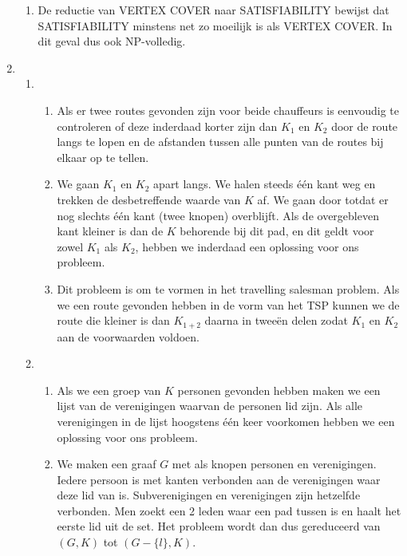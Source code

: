 \documentclass[11pt]{article}
\begin{document}
\begin{enumerate}
\begin{enumerate}
            \item
                De reductie van VERTEX COVER naar SATISFIABILITY bewijst dat
                SATISFIABILITY minstens net zo moeilijk is als VERTEX COVER. In
                dit geval dus ook NP-volledig.

        \end{enumerate}
    \item
        \begin{enumerate}
            \item
                \begin{enumerate}[a]
                    \item Als er twee routes gevonden zijn voor beide chauffeurs is eenvoudig te controleren of deze inderdaad korter zijn dan $K_1$ en $K_2$ door de route langs te lopen en de afstanden tussen alle punten van de routes bij elkaar op te tellen.
                    \item We gaan $K_1$ en $K_2$ apart langs. We halen steeds \'{e}\'{e}n kant weg en trekken de desbetreffende waarde van $K$ af. We gaan door totdat er nog slechts \'{e}\'{e}n kant (twee knopen) overblijft. Als de overgebleven kant kleiner is dan de $K$ behorende bij dit pad, en dit geldt voor zowel $K_1$ als $K_2$, hebben we inderdaad een oplossing voor ons probleem.
                    \item Dit probleem is om te vormen in het travelling salesman problem. Als we een route gevonden hebben in de vorm van het TSP kunnen we de route die kleiner is dan $K_{1+2}$ daarna in twee\"{e}n delen zodat $K_1$ en $K_2$ aan de voorwaarden voldoen.
                \end{enumerate}
            \item
                \begin{enumerate}[a]
                    \item Als we een groep van $K$ personen gevonden hebben
                        maken we een lijst van de verenigingen waarvan de
                        personen lid zijn. Als alle verenigingen in de lijst
                        hoogstens één keer voorkomen hebben we een
                        oplossing voor ons probleem.

                    \item We maken een graaf $G$ met als knopen personen en
                        verenigingen. Iedere persoon is met kanten verbonden aan
                        de verenigingen waar deze lid van is. Subverenigingen en
                        verenigingen zijn hetzelfde verbonden.
                        Men zoekt een 2 leden waar een pad tussen is en haalt
                        het eerste lid uit de set. Het probleem wordt dan dus
                        gereduceerd van $(G, K)$ tot $(G - \{l\}, K)$.


\end{enumerate}
\end{enumerate}
\end{enumerate}
\end{document}
